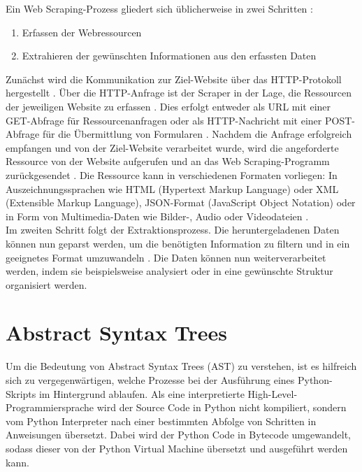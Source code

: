 \documentclass[german,bachelor]{swsLeipzig}
\begin{document}
Ein Web Scraping-Prozess gliedert sich üblicherweise in zwei Schritten \cite[]{zhao2017web}:
\begin{enumerate}
 \item Erfassen der Webressourcen
 \item Extrahieren der gewünschten Informationen aus den erfassten Daten
\end{enumerate}
Zunächst wird die Kommunikation zur Ziel-Website über das HTTP-Protokoll hergestellt \cite[]{10.1093/bib/bbt026}.
Über die HTTP-Anfrage ist der Scraper in der Lage, die Ressourcen der jeweiligen Website zu erfassen \cite[]{zhao2017web}.
Dies erfolgt entweder als URL mit einer GET-Abfrage für Ressourcenanfragen oder als HTTP-Nachricht mit einer
POST-Abfrage für die Übermittlung von Formularen \cite[]{10.1093/bib/bbt026}.
Nachdem die Anfrage erfolgreich empfangen und von der Ziel-Website verarbeitet wurde, wird die angeforderte Ressource
von der Website aufgerufen und an das Web Scraping-Programm zurückgesendet \cite[]{zhao2017web}.
Die Ressource kann in verschiedenen Formaten vorliegen:
In Auszeichnungssprachen wie HTML (Hypertext Markup Language) oder XML (Extensible Markup Language), JSON-Format
(JavaScript Object Notation) oder in Form von Multimedia-Daten wie Bilder-, Audio oder Videodateien \cite[]{zhao2017web}.\\

Im zweiten Schritt folgt der Extraktionsprozess.
Die heruntergeladenen Daten können nun geparst werden, um die benötigten Information zu filtern und in ein geeignetes Format
umzuwandeln \cite[]{10.1093/bib/bbt026}.
Die Daten können nun weiterverarbeitet werden, indem sie beispielsweise analysiert oder in eine gewünschte Struktur
organisiert werden.\\


\section{Abstract Syntax Trees}
Um die Bedeutung von Abstract Syntax Trees (AST) zu verstehen, ist es hilfreich sich zu vergegenwärtigen, welche Prozesse
bei der Ausführung eines Python-Skripts im Hintergrund ablaufen.
Als eine interpretierte High-Level-Programmiersprache wird der Source Code in Python nicht kompiliert, sondern vom
Python Interpreter nach einer bestimmten Abfolge von Schritten in Anweisungen übersetzt.
Dabei wird der Python Code in Bytecode umgewandelt, sodass dieser von der Python Virtual Machine
übersetzt und ausgeführt werden kann. \\
\end{document}

